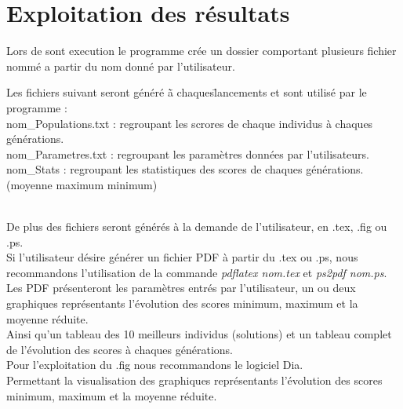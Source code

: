 \documentclass[a4paper,11pt]{article}
\begin{document}
\section{Exploitation des résultats}
Lors de sont execution le programme crée un dossier comportant plusieurs fichier nommé a partir du nom donné par l'utilisateur.\\
\begin{tabbing}
Les fichiers suivant seront généré \=à chaques\= lancements et sont utilisé par le programme : \\
nom\_Populations.txt : \> regroupant les scrores de chaque individus à chaques générations.\\
nom\_Parametres.txt : \>	regroupant les paramètres données par l'utilisateurs.\\
nom\_Stats : \> regroupant les statistiques des scores de chaques générations. \\
\>\>(moyenne maximum minimum)\\\\
\end{tabbing}
De plus des fichiers seront générés à la demande de l'utilisateur, en .tex, .fig ou .ps.\\
Si l'utilisateur désire générer un fichier PDF  à partir du .tex ou .ps, nous recommandons l'utilisation de la commande \textit{pdflatex nom.tex} et \textit{ps2pdf nom.ps}.\\
Les PDF présenteront les paramètres entrés par l'utilisateur, un ou deux graphiques représentants l'évolution des scores minimum, maximum et la moyenne réduite.\\
Ainsi qu'un tableau des 10 meilleurs individus (solutions) et un tableau complet de l'évolution des scores à chaques générations.\\
Pour l'exploitation du .fig nous recommandons le logiciel Dia.\\
Permettant la visualisation des graphiques représentants l'évolution des scores minimum, maximum et la moyenne réduite.\\

	
\end{document}
